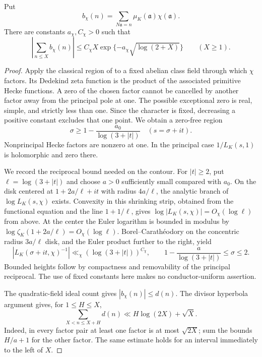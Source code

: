 \begin{lemma}
\label{nh:mertens}
Put
\[
 b_\chi(n)=\sum_{N\mathfrak a=n}
               \mu_K(\mathfrak a)\chi(\mathfrak a).
\]
There are constants $a_\chi,C_\chi>0$ such that
\begin{equation}\label{nh:mertens-bound}
 \left|\sum_{n\leq X}b_\chi(n)\right|
 \leq C_\chi X\exp\{-a_\chi\sqrt{\log(2+X)}\}
 \qquad(X\geq1).
\end{equation}
\end{lemma}

\begin{proof}
Apply the classical region of
\citet[Theorem~3.1, p.~1051]{thornerzaman2019} to a fixed abelian
class field through which $\chi$ factors. Its Dedekind zeta
function is the product of the associated primitive Hecke
functions. A zero of the chosen factor cannot be cancelled by
another factor away from the principal pole at one. The possible
exceptional zero is real, simple, and strictly less than one.
Since the character is fixed, decreasing a positive constant
excludes that one point. We obtain a zero-free region
\[
 \sigma\geq1-\frac{a_0}{\log(3+|t|)}
 \quad(s=\sigma+it).
\]
Nonprincipal Hecke factors are nonzero at one. In the principal
case $1/L_K(s,1)$ is holomorphic and zero there.

We record the reciprocal bound needed on the contour. For
$|t|\geq2$, put $\ell=\log(3+|t|)$ and choose $a>0$ sufficiently
small compared with $a_0$. On the disk centered at
$1+2a/\ell+it$ with radius $4a/\ell$, the analytic branch of
$\log L_K(s,\chi)$ exists. Convexity in this shrinking strip,
obtained from the functional equation and the line
$1+1/\ell$, gives
$\log|L_K(s,\chi)|=O_\chi(\log\ell)$ from above.
At the center the Euler logarithm is bounded in modulus by
$\log\zeta_K(1+2a/\ell)=O_\chi(\log\ell)$.
Borel--Carath\'eodory on the concentric radius $3a/\ell$ disk,
and the Euler product further to the right, yield
\[
 |L_K(\sigma+it,\chi)^{-1}|
       \ll_\chi(\log(3+|t|))^{C_\chi},
 \qquad 1-\frac a{\log(3+|t|)}\leq\sigma\leq2.
\]
Bounded heights follow by compactness and removability of the
principal reciprocal. The use of fixed constants here makes
no conductor-uniform assertion.

The quadratic-field ideal count gives $|b_\chi(n)|\leq d(n)$.
The divisor hyperbola argument gives, for $1\leq H\leq X$,
\[
 \sum_{X<n\leq X+H}d(n)\ll H\log(2X)+\sqrt X.
\]
Indeed, in every factor pair at least one factor is at most
$\sqrt{2X}$; sum the bounds $H/a+1$ for the other factor.
The same estimate holds for an interval immediately to the left
of $X$.


\end{proof}
